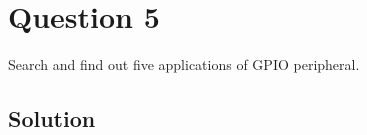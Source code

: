 \section*{Question 5}

Search and find out five applications of GPIO peripheral.

\subsection*{Solution}

